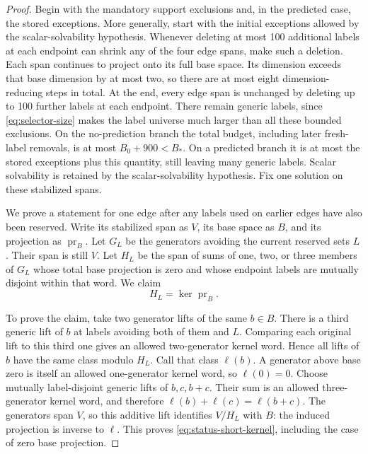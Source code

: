 \begin{proof}
Begin with the mandatory support exclusions and, in the predicted
case, the stored exceptions. More generally, start with the initial
exceptions allowed by the scalar-solvability hypothesis. Whenever deleting at most 100 additional
labels at each endpoint can shrink any of the four edge spans, make
such a deletion. Each span continues to project onto its full base
space. Its dimension exceeds that base dimension by at most two, so
there are at most eight dimension-reducing steps in total. At the end,
every edge span is unchanged by deleting up to 100 further labels at
each endpoint. There remain generic labels, since
\eqref{eq:selector-size} makes the label universe much larger than all
these bounded exclusions. On the no-prediction branch the total budget,
including later fresh-label removals, is at most $B_0+900<B_*$.
On a predicted branch it is at most the stored exceptions plus this
quantity, still leaving many generic labels. Scalar solvability is
retained by the scalar-solvability hypothesis. Fix one solution on these stabilized
spans.

We prove a statement for one edge after any labels used on earlier
edges have also been reserved. Write its stabilized span as $V$, its
base space as $B$, and its projection as $\operatorname{pr}_B$. Let $G_L$ be the
generators avoiding the current reserved sets $L$. Their span is still
$V$. Let $H_L$ be the span of sums of one, two, or three members of
$G_L$ whose total base projection is zero and whose endpoint labels
are mutually disjoint within that word. We claim
\begin{equation}
\label{eq:status-short-kernel}
H_L=\ker\operatorname{pr}_B.
\end{equation}

To prove the claim, take two generator lifts of the same $b\in B$.
There is a third generic lift of $b$ at labels avoiding both of them
and $L$. Comparing each original lift to this third one gives an
allowed two-generator kernel word. Hence all lifts of $b$ have the
same class modulo $H_L$. Call that class $\ell(b)$. A generator
above base zero is itself an allowed one-generator kernel word, so
$\ell(0)=0$. Choose mutually label-disjoint generic lifts of
$b,c,b+c$. Their sum is an allowed three-generator kernel word,
and therefore $\ell(b)+\ell(c)=\ell(b+c)$. The generators span $V$,
so this additive lift identifies $V/H_L$ with $B$: the induced
projection is inverse to $\ell$. This proves
\eqref{eq:status-short-kernel}, including the case of zero base
projection.


\end{proof}
